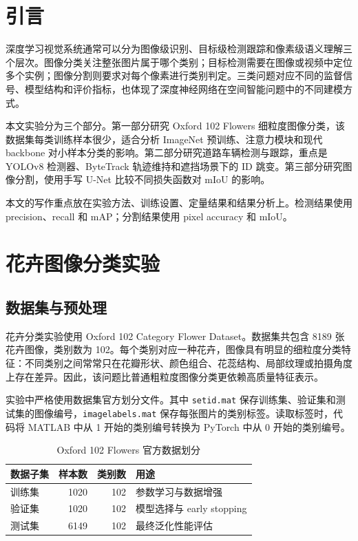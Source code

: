 \documentclass[UTF8,a4paper,11pt]{ctexart}
\newcommand{\code}[1]{\texttt{#1}}
\begin{document}
\section{引言}

深度学习视觉系统通常可以分为图像级识别、目标级检测跟踪和像素级语义理解三个层次。图像分类关注整张图片属于哪个类别；目标检测需要在图像或视频中定位多个实例；图像分割则要求对每个像素进行类别判定。三类问题对应不同的监督信号、模型结构和评价指标，也体现了深度神经网络在空间智能问题中的不同建模方式。

本文实验分为三个部分。第一部分研究 Oxford 102 Flowers 细粒度图像分类，该数据集每类训练样本很少，适合分析 ImageNet 预训练、注意力模块和现代 backbone 对小样本分类的影响。第二部分研究道路车辆检测与跟踪，重点是 YOLOv8 检测器、ByteTrack 轨迹维持和遮挡场景下的 ID 跳变。第三部分研究图像分割，使用手写 U-Net 比较不同损失函数对 mIoU 的影响。

本文的写作重点放在实验方法、训练设置、定量结果和结果分析上。检测结果使用 precision、recall 和 mAP；分割结果使用 pixel accuracy 和 mIoU。

\section{花卉图像分类实验}

\subsection{数据集与预处理}

花卉分类实验使用 Oxford 102 Category Flower Dataset。数据集共包含 8189 张花卉图像，类别数为 102。每个类别对应一种花卉，图像具有明显的细粒度分类特征：不同类别之间常常只在花瓣形状、颜色组合、花蕊结构、局部纹理或拍摄角度上存在差异。因此，该问题比普通粗粒度图像分类更依赖高质量特征表示。

实验中严格使用数据集官方划分文件。其中 \code{setid.mat} 保存训练集、验证集和测试集的图像编号，\code{imagelabels.mat} 保存每张图片的类别标签。读取标签时，代码将 MATLAB 中从 1 开始的类别编号转换为 PyTorch 中从 0 开始的类别编号。

\begin{table}[H]
    \centering
    \caption{Oxford 102 Flowers 官方数据划分}
    \small
    \begin{tabular}{lrrl}
        \toprule
        数据子集 & 样本数 & 类别数 & 用途 \\
        \midrule
        训练集 & 1020 & 102 & 参数学习与数据增强 \\
        验证集 & 1020 & 102 & 模型选择与 early stopping \\
        测试集 & 6149 & 102 & 最终泛化性能评估 \\
        \bottomrule
    \end{tabular}
\end{table}
\end{document}
